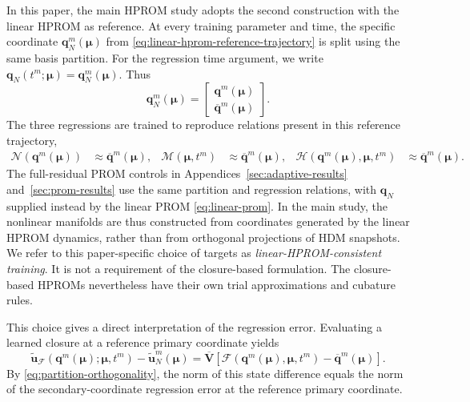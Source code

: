 \documentclass[11pt]{article}
\newcommand{\q}{\mathbf q}
\newcommand{\qbar}{\overline{\mathbf q}}
\newcommand{\utilde}{\widetilde{\mathbf u}}
\newcommand{\mub}{\bm\mu}
\begin{document}
In this paper, the main HPROM study adopts the second construction with the
linear HPROM as reference.  At every training parameter and time, the
specific coordinate $\q_N^m(\mub)$ from
\eqref{eq:linear-hprom-reference-trajectory} is split using the same basis
partition.  For the regression time argument, we write
$\q_N(t^m;\mub)=\q_N^m(\mub)$.  Thus
\begin{equation}
\q_N^m(\mub)=
\begin{bmatrix}
\q^m(\mub)\\[1mm]\qbar^m(\mub)
\end{bmatrix}.
\label{eq:linear-hprom-reference-partition}
\end{equation}
The three regressions are trained to reproduce relations present in this
reference trajectory,
\begin{align}
\mathcal N(\q^m(\mub))&\approx\qbar^m(\mub),
&
\mathcal M(\mub,t^m)&\approx\qbar^m(\mub),
&
\mathcal H(\q^m(\mub),\mub,t^m)&\approx\qbar^m(\mub).
\label{eq:closure-reference-targets}
\end{align}
The full-residual PROM controls in Appendices~\ref{sec:adaptive-results}
and~\ref{sec:prom-results} use the same partition and regression relations,
with $\q_N$ supplied instead by the linear PROM \eqref{eq:linear-prom}.
In the main study, the nonlinear manifolds are thus constructed
from coordinates generated by the linear HPROM dynamics, rather than from
orthogonal projections of HDM snapshots.  We refer to this paper-specific
choice of targets as \emph{linear-HPROM-consistent training}.  It is not a
requirement of the closure-based formulation.  The closure-based HPROMs
nevertheless have their own trial approximations and cubature rules.

This choice gives a direct interpretation of the regression error.
Evaluating a learned closure at a reference primary coordinate yields
\begin{equation}
\utilde_{\mathcal F}(\q^m(\mub);\mub,t^m)-\utilde_N^m(\mub)
=\overline{\mathbf V}
\left[\mathcal F(\q^m(\mub),\mub,t^m)-\qbar^m(\mub)\right].
\label{eq:closure-reference-reconstruction-error}
\end{equation}
By \eqref{eq:partition-orthogonality}, the norm of this state difference
equals the norm of the secondary-coordinate regression error at the
reference primary coordinate.
\end{document}
